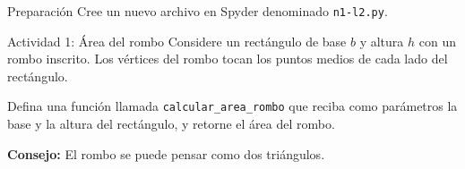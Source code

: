\documentclass{ip-lab}
\begin{document}
\maketitle

\begin{sectionbox}{Preparación}
    Cree un nuevo archivo en Spyder denominado \texttt{n1-l2.py}.
\end{sectionbox}

\begin{sectionbox}{Actividad 1: Área del rombo}
Considere un rectángulo de base $b$ y altura $h$ con un rombo inscrito. Los vértices del rombo tocan los puntos medios de cada lado del rectángulo.

\begin{center}
\end{center}

Defina una función llamada \texttt{calcular\_area\_rombo} que reciba como parámetros la base y la altura del rectángulo, y retorne el área del rombo.

\textbf{Consejo:} El rombo se puede pensar como dos triángulos.
\end{sectionbox}
\end{document}
